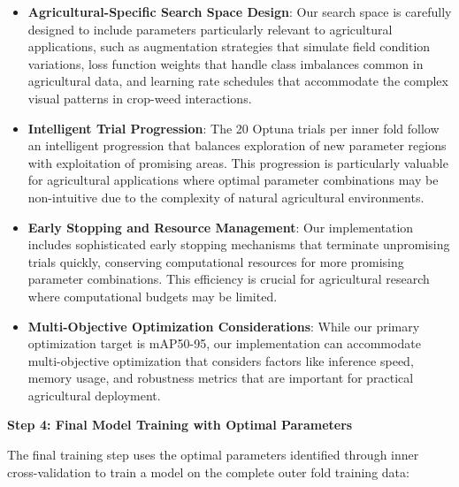 \begin{itemize}
    \item \textbf{Agricultural-Specific Search Space Design}: Our search space is carefully designed to include parameters particularly relevant to agricultural applications, such as augmentation strategies that simulate field condition variations, loss function weights that handle class imbalances common in agricultural data, and learning rate schedules that accommodate the complex visual patterns in crop-weed interactions.
    
    \item \textbf{Intelligent Trial Progression}: The 20 Optuna trials per inner fold follow an intelligent progression that balances exploration of new parameter regions with exploitation of promising areas. This progression is particularly valuable for agricultural applications where optimal parameter combinations may be non-intuitive due to the complexity of natural agricultural environments.
    
    \item \textbf{Early Stopping and Resource Management}: Our implementation includes sophisticated early stopping mechanisms that terminate unpromising trials quickly, conserving computational resources for more promising parameter combinations. This efficiency is crucial for agricultural research where computational budgets may be limited.
    
    \item \textbf{Multi-Objective Optimization Considerations}: While our primary optimization target is mAP50-95, our implementation can accommodate multi-objective optimization that considers factors like inference speed, memory usage, and robustness metrics that are important for practical agricultural deployment.
\end{itemize}

\textbf{Step 4: Final Model Training with Optimal Parameters}

The final training step uses the optimal parameters identified through inner cross-validation to train a model on the complete outer fold training data:

